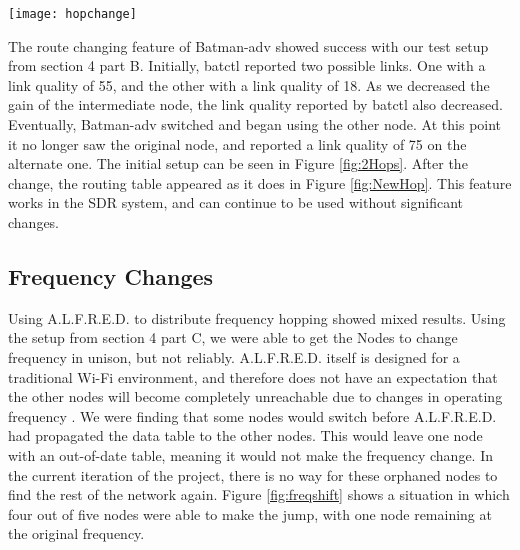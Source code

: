 \begin{figure*}
	\centering
	\texttt{[image: hopchange]}
	\caption{After the gain is reduced, the packets are now routing through a different node.}
	\label{fig:NewHop}
\end{figure*}

The route changing feature of Batman-adv showed success with our test setup from section 4 part B. Initially, batctl reported two possible links. One with a link quality of 55, and the other with a link quality of 18. As we decreased the gain of the intermediate node, the link quality reported by batctl also decreased. Eventually, Batman-adv switched and began using the other node. At this point it no longer saw the original node, and reported a link quality of 75 on the alternate one. The initial setup can be seen in Figure \ref{fig:2Hops}. After the change, the routing table appeared as it does in Figure \ref{fig:NewHop}. This feature works in the SDR system, and can continue to be used without significant changes.  

\subsection{Frequency Changes}

Using A.L.F.R.E.D. to distribute frequency hopping showed mixed results. Using the setup from section 4 part C, we were able to get the Nodes to change frequency in unison, but not reliably. A.L.F.R.E.D. itself is designed for a traditional Wi-Fi environment, and therefore does not have an expectation that the other nodes will become completely unreachable due to changes in operating frequency \cite{0015}. We were finding that some nodes would switch before A.L.F.R.E.D. had propagated the data table to the other nodes. This would leave one node with an out-of-date table, meaning it would not make the frequency change. In the current iteration of the project, there is no way for these orphaned nodes to find the rest of the network again. Figure \ref{fig:freqshift} shows a situation in which four out of five nodes were able to make the jump, with one node remaining at the original frequency.



